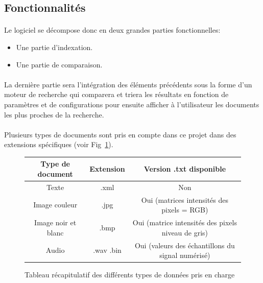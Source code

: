 \documentclass[../main.tex]{subfiles}
\begin{document}
    \subsection{Fonctionnalités}
    \paragraph{}
    Le logiciel se décompose donc en deux grandes parties fonctionnelles:
    \begin{itemize}
        \item Une partie d’indexation.
        \item Une partie de comparaison.
    \end{itemize}

    \paragraph{}
    La dernière partie sera l'intégration des éléments précédents sous la forme d’un moteur de recherche qui comparera et triera les résultats en fonction de paramètres et de configurations pour ensuite afficher à l’utilisateur les documents les plus proches de la recherche.

    \paragraph{}
    Plusieurs types de documents sont pris en compte dans ce projet dans des extensions spécifiques (voir Fig~\ref{fig:ext_types}).  	

    \begin{figure}[h]
        \centering
        \begin{tabular}{| c | c | c |}
            \hline
            \rowcolor{Gray}Type de document & Extension & Version .txt disponible \\
            \hline
            Texte & .xml & Non \\
            \hline
            Image couleur & .jpg & Oui (matrices intensités des pixels = RGB) \\
            \hline
            Image noir et blanc & .bmp & Oui (matrice intensités des pixels niveau de gris) \\
            \hline
            Audio & .wav .bin &  Oui (valeurs des échantillons du signal numérisé) \\
            \hline
        \end{tabular}

        \caption{Tableau récapitulatif des différents types de données pris en charge}
        \label{fig:ext_types}
    \end{figure}
\end{document}
